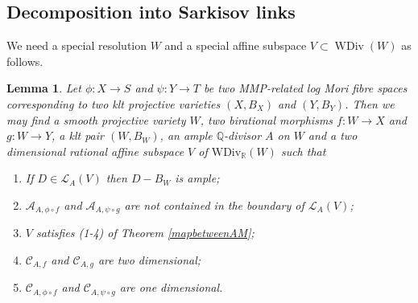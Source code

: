 \documentclass[11pt]{amsart}
\newtheorem{lem}[defn]{Lemma}
\begin{document}
\subsection{Decomposition into Sarkisov links}
We need a special resolution $W$ and a special  affine subspace $V \subset \operatorname{WDiv}(W)$ as follows.

\begin{lem}\label{keylemma}
  \cite[Lemma 4.1]{haconSarkisovProgram2012} Let $ \phi:X\to S $ and $ \psi :Y\to T  $ be two MMP-related log Mori fibre spaces corresponding to two klt projective varieties $ (X,B_X) $ and $ (Y,B_Y) $. Then we may find a smooth projective variety $ W $, two birational morphisms $ f:W\to X $ and $ g:W\to Y $, a klt pair $ (W,B_{W}) $, an ample $ \mathbb{Q} $-divisor $ A $ on $ W $ and a two dimensional rational affine subspace $ V $ of $ \mathrm{WDiv}_\mathbb{R}(W) $ such that 
  \begin{enumerate}
    \item If $ D\in \mathcal{L}_A(V) $ then $ D-B_W $ is ample;
    \item $ \mathcal{A}_{A,\phi\circ f} $ and $ \mathcal{A}_{A,\psi\circ g} $ are not contained in the boundary of $ \mathcal{L}_A(V) $;
    \item $ V $ satisfies (1-4) of Theorem \ref{mapbetweenAM};
    \item $ \mathcal{C}_{A,f} $ and $ \mathcal{C}_{A,g} $ are two dimensional;
    \item $ \mathcal{C}_{A,\phi\circ f} $ and $ \mathcal{C}_{A,\psi\circ g} $ are one dimensional.
  \end{enumerate}
\end{lem}
\end{document}
